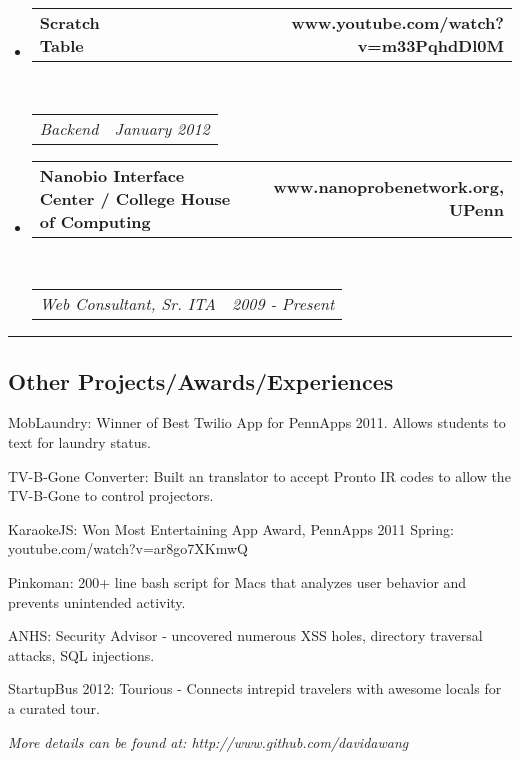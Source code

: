 \documentclass[10pt,letterpaper]{article}
\makeatletter
\newenvironment{indentsection}[1]%
{\begin{list}{}%
  {\setlength{\leftmargin}{#1}}%
  \item[]%
}
{\end{list}}
\newcommand{\headerrow}[2]
{\begin{tabular*}{\linewidth}{l@{\extracolsep{\fill}}r}
  #1 &
  #2 \\
\end{tabular*}}
\makeatother
\begin{document}
\begin{itemize}
  \item
  \headerrow
    {\textbf{Scratch Table}}
    {\textbf{www.youtube.com/watch?v=m33PqhdDl0M}}
  \\
  \headerrow
    {\emph{Backend}}
    {\emph{January 2012}}

  \item
  \headerrow
    {\textbf{Nanobio Interface Center / College House of Computing}}
    {\textbf{www.nanoprobenetwork.org, UPenn}}
  \\
  \headerrow
    {\emph{Web Consultant, Sr. ITA }}
    {\emph{2009 - Present}}

\end{itemize}


\hrule
\vspace{-0.4em}
\subsection*{Other Projects/Awards/Experiences}

\begin{indentsection}{\parindent}
\begin{description*}
  \item[MobLaundry:] Winner of Best Twilio App for PennApps 2011. Allows students to text for laundry status.
  \item[TV-B-Gone Converter:] Built an translator to accept Pronto IR codes to allow the TV-B-Gone to control projectors.
  \item[KaraokeJS:] Won Most Entertaining App Award, PennApps 2011 Spring: youtube.com/watch?v=ar8go7XKmwQ
  \item[Pinkoman:] 200+ line bash script for Macs that analyzes user behavior and prevents unintended activity.
  \item[ANHS:] Security Advisor - uncovered numerous XSS holes, directory traversal attacks, SQL injections.
  \item[StartupBus 2012:] Tourious - Connects intrepid travelers with awesome locals for a curated tour.
\end{description*}
\textit{More details can be found at: http://www.github.com/davidawang} 
\end{indentsection}
\end{document}
